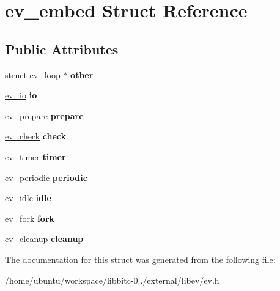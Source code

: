 \hypertarget{structev__embed}{\section{ev\-\_\-embed Struct Reference}
\label{structev__embed}
}
\subsection*{Public Attributes}
\begin{DoxyCompactItemize}
\item 
\hypertarget{structev__embed_acb0b3a48271177125760d6b9914e71a7}{struct ev\-\_\-loop $\ast$ {\bfseries other}}\label{structev__embed_acb0b3a48271177125760d6b9914e71a7}

\item 
\hypertarget{structev__embed_ab085dde44a1b194137db275caa1cfaa4}{\hyperlink{structev__io}{ev\-\_\-io} {\bfseries io}}\label{structev__embed_ab085dde44a1b194137db275caa1cfaa4}

\item 
\hypertarget{structev__embed_a779a812e0c15c15df660c210ee82fb62}{\hyperlink{structev__prepare}{ev\-\_\-prepare} {\bfseries prepare}}\label{structev__embed_a779a812e0c15c15df660c210ee82fb62}

\item 
\hypertarget{structev__embed_a96ff5f39de1b7d6c6ac914933063b2f8}{\hyperlink{structev__check}{ev\-\_\-check} {\bfseries check}}\label{structev__embed_a96ff5f39de1b7d6c6ac914933063b2f8}

\item 
\hypertarget{structev__embed_a52f8a6147c42ecfe547a44b1f391762d}{\hyperlink{structev__timer}{ev\-\_\-timer} {\bfseries timer}}\label{structev__embed_a52f8a6147c42ecfe547a44b1f391762d}

\item 
\hypertarget{structev__embed_aafa62ad98fab654b15c2128ea4b6b167}{\hyperlink{structev__periodic}{ev\-\_\-periodic} {\bfseries periodic}}\label{structev__embed_aafa62ad98fab654b15c2128ea4b6b167}

\item 
\hypertarget{structev__embed_a133d7aa3da26a48be70e26eb32aed3d7}{\hyperlink{structev__idle}{ev\-\_\-idle} {\bfseries idle}}\label{structev__embed_a133d7aa3da26a48be70e26eb32aed3d7}

\item 
\hypertarget{structev__embed_ad1d0209f5e2006e373028e8cb206c10b}{\hyperlink{structev__fork}{ev\-\_\-fork} {\bfseries fork}}\label{structev__embed_ad1d0209f5e2006e373028e8cb206c10b}

\item 
\hypertarget{structev__embed_ac072a5985c406408336aad8b1178ed13}{\hyperlink{structev__cleanup}{ev\-\_\-cleanup} {\bfseries cleanup}}\label{structev__embed_ac072a5985c406408336aad8b1178ed13}

\end{DoxyCompactItemize}


The documentation for this struct was generated from the following file\-:\begin{DoxyCompactItemize}
\item 
/home/ubuntu/workspace/libbitc-\/0../external/libev/ev.\-h\end{DoxyCompactItemize}
